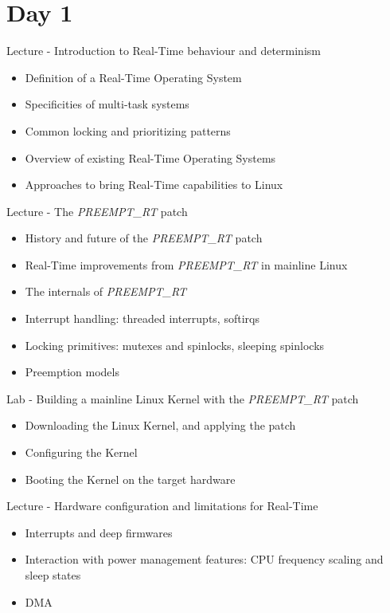 \documentclass[a4paper,12pt,obeyspaces,spaces,hyphens]{article}
\begin{document}
\section{Day 1}

\feagendaonecolumn
{Lecture - Introduction to Real-Time behaviour and determinism}
{
  \begin{itemize}
  \item Definition of a Real-Time Operating System
  \item Specificities of multi-task systems
  \item Common locking and prioritizing patterns
  \item Overview of existing Real-Time Operating Systems
  \item Approaches to bring Real-Time capabilities to Linux
  \end{itemize}
}

\feagendatwocolumn
{Lecture - The {\em PREEMPT\_RT} patch}
{
  \begin{itemize}
  \item History and future of the {\em PREEMPT\_RT} patch
  \item Real-Time improvements from {\em PREEMPT\_RT} in mainline Linux
  \item The internals of {\em PREEMPT\_RT}
  \item Interrupt handling: threaded interrupts, softirqs
  \item Locking primitives: mutexes and spinlocks, sleeping spinlocks
  \item Preemption models
  \end{itemize}
}
{Lab - Building a mainline Linux Kernel with the {\em PREEMPT\_RT} patch}
{
  \begin{itemize}
  \item Downloading the Linux Kernel, and applying the patch
  \item Configuring the Kernel
  \item Booting the Kernel on the target hardware
 \end{itemize}
}

\feagendaonecolumn
{Lecture - Hardware configuration and limitations for Real-Time}
{
  \begin{itemize}
  \item Interrupts and deep firmwares
  \item Interaction with power management features: CPU frequency
    scaling and sleep states
  \item DMA
  \end{itemize}
}
\end{document}
